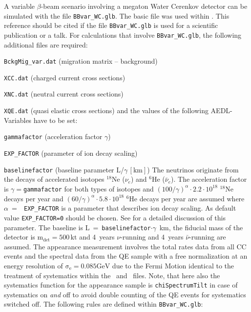 A variable $\beta$-beam scenario involving a megaton Water Cerenkov detector can be simulated with the file 
{\tt BBvar\_WC.glb}. The basic file was used within \cite{Huber:2005jk}. This reference
should be cited if the file {\tt BBvar\_WC.glb} is used for a scientific publication or a talk. For calculations that
involve {\tt BBvar\_WC.glb}, the following additional files are required:
\bi
\item {\tt BckgMig\_var.dat} (migration matrix -- background)
\item {\tt XCC.dat} (charged current cross sections)
\item {\tt XNC.dat} (neutral current cross sections)
\item {\tt XQE.dat} (quasi elastic cross sections)
\ei
and the values of the following {\sf AEDL}-Variables have to be set:
\bi
\item {\tt gammafactor} (acceleration factor $\gamma$)
\item {\tt EXP\_FACTOR} (parameter of ion decay scaling)
\item {\tt baselinefactor} (baseline parameter L/$\gamma\,\left[\mathrm{km}\right]$)
\ei
The neutrinos originate from the decays of accelerated isotopes $^{18}$Ne ($\nu_e$) and $^6$He ($\bar{\nu}_e$).
The acceleration factor is $\gamma=${\tt gammafactor} for both types of isotopes and
$(100/\gamma)^\alpha\cdot2.2\cdot10^{18}$ $^{18}$Ne decays per
year and $(60/\gamma)^\alpha\cdot5.8\cdot10^{18}$ $^{6}$He decays per year are assumed where $\alpha$~=~{\tt
EXP\_FACTOR} is a parameter that describes ion decay scaling. As default value {\tt EXP\_FACTOR=0} should be chosen.
See \cite{Huber:2005jk} for a detailed discussion of this parameter. The baseline is
L~=~{\tt baselinefactor}$\cdot\gamma$~km, the
fiducial mass of the detector is $\mathrm{m_{det} = 500 \,kt}$ and 4~years $\nu$-running and 4~years
$\bar{\nu}$-running are assumed. The appearance measurement involves the total rates data from all CC events and the spectral data
from the QE sample with a free normalization at an energy resolution of $\mathrm{\sigma_e=0.085GeV}$ due to the
Fermi Motion identical to the treatment of systematics within the \TtoK\ and \TtoHK\ files. Note, that here also the systematics
function for the appearance sample is {\tt chiSpectrumTilt} in case of systematics on {\em and} off to avoid double counting of the
QE events for systematics switched off. The following rules are defined within {\tt BBvar\_WC.glb}:
